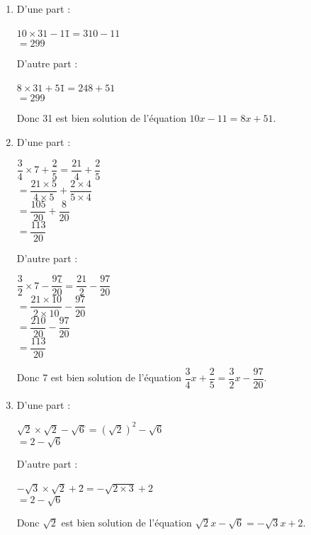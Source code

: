 \documentclass[a4paper,11pt,exos]{nsi} %
\begin{document}
\begin{enumerate}
    \item \begin{multicols}{2}
    D'une part :
    \begin{tabbing}
        $10\times 31-11$\=$=310-11$\\
        \>$=299$
    \end{tabbing}
    D'autre part :
    \begin{tabbing}
        $8\times 31+51$\=$=248+51$\\
        \>  $=299$
    \end{tabbing}
    \end{multicols}
    Donc 31 est bien solution de l'équation $10x-11 = 8x +51$.
    
    \item \begin{multicols}{2}
        D'une part :
        \begin{tabbing}
            $\dfrac{3}{4}\times 7+\dfrac{2}{5}$\=$=\dfrac{21}{4}+\dfrac{2}{5}$\\[.5em]
            \>$=\dfrac{21\times 5}{4\times 5}+\dfrac{2\times 4}{5\times 4}$\\[.5em]
            \>$=\dfrac{105}{20}+\dfrac{8}{20}$\\[.5em]
            \>$=\dfrac{113}{20}$
        \end{tabbing}
        D'autre part :
        \begin{tabbing}
            $\dfrac{3}{2}\times 7-\dfrac{97}{20}$\=$=\dfrac{21}{2}-\dfrac{97}{20}$\\[.5em]
            \>  $=\dfrac{21\times 10}{2\times 10}-\dfrac{97}{20}$\\[.5em]
            \>  $=\dfrac{210}{20}-\dfrac{97}{20}$\\[.5em]
            \>  $=\dfrac{113}{20}$
        \end{tabbing}
        \end{multicols}
        Donc 7 est bien solution de l'équation $\dfrac{3}{4}x+\dfrac{2}{5}=\dfrac{3}{2}x-\dfrac{97}{20}$.

        \item \begin{multicols}{2}
            D'une part :
            \begin{tabbing}
                $\sqrt{2}\times \sqrt{2}-\sqrt{6}$\=$=\left(\sqrt{2}\right)^2-\sqrt{6}$\\[.5em]
                \>  $=2-\sqrt{6}$
            \end{tabbing}
            D'autre part :
            \begin{tabbing}
                $-\sqrt{3}\times \sqrt{2}+2$\=$=-\sqrt{2\times 3}+2$\\
                \>  $=2-\sqrt{6}$
            \end{tabbing}
            \end{multicols}
            Donc $\sqrt{2}$ est bien solution de l'équation $\sqrt{2}x-\sqrt{6}=-\sqrt{3}x+2$.
\end{enumerate}
\end{document}
